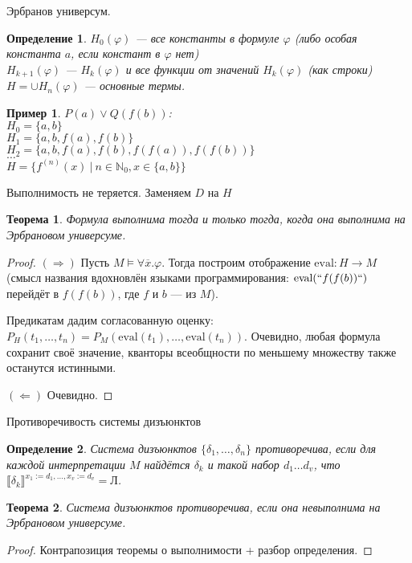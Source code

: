 \documentclass[aspectratio=169]{beamer}
\newtheorem{thm}{Теорема}[section]
\newtheorem{dfn}{Определение}[section]
\newtheorem{exm}{Пример}[section]
\begin{document}
\begin{frame}{Эрбранов универсум.}
\begin{dfn}$H_0(\varphi)$ --- все константы в формуле $\varphi$ (либо особая константа $a$, если констант в $\varphi$ нет)\\
$H_{k+1}(\varphi)$ --- $H_k(\varphi)$ и все функции от значений $H_k(\varphi)$ (как строки)\\

$H = \cup H_n(\varphi)$ --- основные термы.
\end{dfn}

\begin{exm}$P(a)\vee Q(f(b))$: \\
$H_0 = \{a,b\}$\\
$H_1 = \{a,b,f(a),f(b)\}$\\
$H_2 = \{a,b,f(a),f(b),f(f(a)),f(f(b))\}$\\
$\dots$\\
$H = \{f^{(n)}(x)\ |\ n \in \mathbb{N}_0, x \in \{a,b\}\}$\end{exm}
\end{frame}

\begin{frame}{Выполнимость не теряется. Заменяем $D$ на $H$}
\begin{thm}Формула выполнима тогда и только тогда, когда она выполнима на Эрбрановом универсуме.\end{thm}
\begin{proof}
$(\Rightarrow)$ Пусть $M \models\forall \overline{x}.\varphi$. Тогда построим отображение $\text{eval}: H \rightarrow M$
(смысл названия вдохновлён языками программирования: $\text{eval}(``f(f(b))``)$ перейдёт в $f(f(b))$, где $f$ и $b$ --- из $M$).

Предикатам дадим согласованную оценку:
$P_H(t_1,\dots,t_n) = P_M(\text{eval}(t_1),\dots,\text{eval}(t_n))$. Очевидно, любая формула сохранит своё значение, кванторы всеобщности
по меньшему множеству также останутся истинными.

$(\Leftarrow)$ Очевидно.
\end{proof}\end{frame}

\begin{frame}{Противоречивость системы дизъюнктов}
\begin{dfn}Система дизъюнктов $\{\delta_1,\dots,\delta_n\}$ противоречива,
если для каждой интерпретации $M$ найдётся $\delta_k$ и такой набор $d_1\dots d_v$,
что $\llbracket\delta_k\rrbracket^{x_1 := d_1, \dots, x_v := d_v} = \text{Л}$.\end{dfn}
\begin{thm}Система дизъюнктов противоречива, если она невыполнима на Эрбрановом универсуме.\end{thm}
\begin{proof}Контрапозиция теоремы о выполнимости + разбор определения.
\end{proof}
\end{frame}
\end{document}

